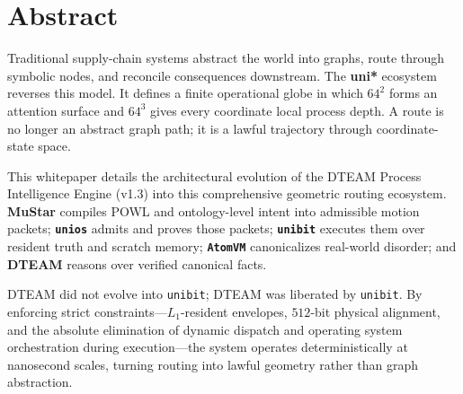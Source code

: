 \chapter*{Abstract}

Traditional supply-chain systems abstract the world into graphs, route through symbolic nodes, and reconcile consequences downstream. The \textbf{uni*} ecosystem reverses this model. It defines a finite operational globe in which $64^2$ forms an attention surface and $64^3$ gives every coordinate local process depth. A route is no longer an abstract graph path; it is a lawful trajectory through coordinate-state space.

This whitepaper details the architectural evolution of the DTEAM Process Intelligence Engine (v1.3) into this comprehensive geometric routing ecosystem. \textbf{MuStar} compiles POWL and ontology-level intent into admissible motion packets; \textbf{\texttt{unios}} admits and proves those packets; \textbf{\texttt{unibit}} executes them over resident truth and scratch memory; \textbf{\texttt{AtomVM}} canonicalizes real-world disorder; and \textbf{DTEAM} reasons over verified canonical facts. 

DTEAM did not evolve into \texttt{unibit}; DTEAM was liberated by \texttt{unibit}. By enforcing strict constraints---$L_1$-resident envelopes, $512$-bit physical alignment, and the absolute elimination of dynamic dispatch and operating system orchestration during execution---the system operates deterministically at nanosecond scales, turning routing into lawful geometry rather than graph abstraction.